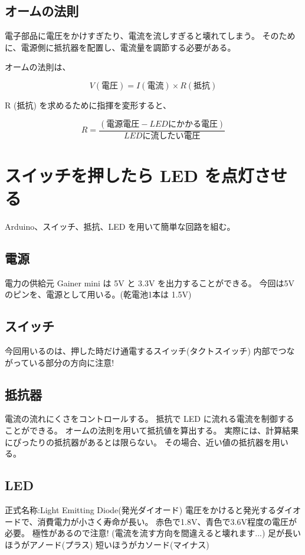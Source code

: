 \documentclass[11pt,a4paper]{jarticle}
\begin{document}
\subsection*{オームの法則}
電子部品に電圧をかけすぎたり、電流を流しすぎると壊れてしまう。
そのために、電源側に抵抗器を配置し、電流量を調節する必要がある。

オームの法則は、

\begin{equation}
 V (電圧) = I (電流) \times R (抵抗)
\end{equation}

R (抵抗) を求めるために指揮を変形すると、

\begin{equation}
 R = \frac{(電源電圧 - LEDにかかる電圧)}{LEDに流したい電圧}
\end{equation}


\section{スイッチを押したら LED を点灯させる}
Arduino、スイッチ、抵抗、LED を用いて簡単な回路を組む。


\subsection*{電源}
電力の供給元
Gainer mini は 5V と 3.3V を出力することができる。
今回は5Vのピンを、電源として用いる。(乾電池1本は 1.5V)

\subsection*{スイッチ}
今回用いるのは、押した時だけ通電するスイッチ(タクトスイッチ)
内部でつながっている部分の方向に注意!

\subsection*{抵抗器}
電流の流れにくさをコントロールする。
抵抗で LED に流れる電流を制御することができる。
オームの法則を用いて抵抗値を算出する。
実際には、計算結果にぴったりの抵抗器があるとは限らない。
その場合、近い値の抵抗器を用いる。

\subsection*{LED}
正式名称:Light Emitting Diode(発光ダイオード)
電圧をかけると発光するダイオードで、消費電力が小さく寿命が長い。
赤色で1.8V、青色で3.6V程度の電圧が必要。
極性があるので注意! (電流を流す方向を間違えると壊れます...)
足が長いほうがアノード(プラス) 短いほうがカソード(マイナス)
\end{document}
